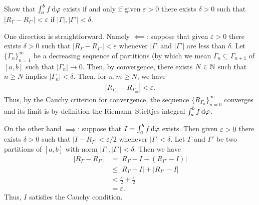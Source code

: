 \begin{problem}
  Show that \(\int_a^bf\mathop{}\!\mathrm{d}\varphi\) exists if and only if given
  \(\varepsilon>0\) there exists \(\delta>0\) such that
  \(\left|R_\Gamma-R_{\Gamma'}\right|<\varepsilon\) if
  \(|\Gamma|,|\Gamma'|<\delta\).
\end{problem}
\begin{solution}
  One direction is straightforward. Namely \(\impliedby\): suppose that
  given \(\varepsilon>0\) there exists \(\delta>0\) such that
  \(|R_\Gamma-R_{\Gamma'}|<\varepsilon\) whenever \(|\Gamma|\) and
  \(|\Gamma'|\) are less than \(\delta\). Let
  \({\{\Gamma_n\}}_{n=1}^\infty\) be a decreasing sequence of partitions
  (by which we mean \(\Gamma_n\subseteq\Gamma_{n+1}\) of \([a,b]\) such
  that \(|\Gamma_n|\to 0\). Then, by convergence, there exists \(N\in\mathbb{N}\)
  such that \(n\geq N\) implies \(|\Gamma_n|<\delta\). Then, for
  \(n,m\geq N\), we have
  \begin{align*}
    |R_{\Gamma_n}-R_{\Gamma_m}|<\varepsilon.
  \end{align*}
  Thus, by the Cauchy criterion for convergence, the sequence
  \({\{R_{\Gamma_n}\}}_{n=0}^\infty\) converges and its limit is by
  definition the Riemann--Stieltjes integral \(\int_a^b f\mathop{}\!\mathrm{d}\varphi\).

  On the other hand \(\implies\): suppose that \(I=\int_a^b f\mathop{}\!\mathrm{d}\varphi\)
  exists. Then given \(\varepsilon>0\) there exists \(\delta>0\) such that
  \(|I-R_\Gamma|<\varepsilon/2\) whenever \(|\Gamma|<\delta\). Let
  \(\Gamma\) and \(\Gamma'\) be two partitions of \([a,b]\) with norm
  \(|\Gamma|,|\Gamma'|<\delta\). Then we have
  \begin{align*}
    |R_\Gamma-R_{\Gamma'}|
    &=|R_\Gamma-I-(R_{\Gamma'}-I)|\\
    &\leq |R_\Gamma-I|+|R_{\Gamma'}-I|\\
    &<\frac{\varepsilon}{2}+\frac{\varepsilon}{2}\\
    &=\varepsilon.
  \end{align*}
  Thus, \(I\) satisfies the Cauchy condition.
\end{solution}

